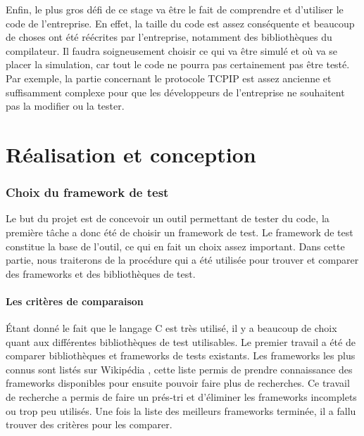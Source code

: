\documentclass[a4paper]{article}
\begin{document}
Enfin, le plus gros défi de ce stage va être le fait de comprendre et d'utiliser
le code de l'entreprise. En effet, la taille du code est assez conséquente et
beaucoup de choses ont été réécrites par l'entreprise, notamment des
bibliothèques du compilateur. Il faudra soigneusement choisir ce qui va être
simulé et où va se placer la simulation, car tout le code ne pourra pas
certainement pas être testé. Par exemple, la partie concernant le protocole
TCPIP est assez ancienne et suffisamment complexe pour que les développeurs de
l'entreprise ne souhaitent pas la modifier ou la tester.
\clearpage
\part{Réalisation et conception}

\section{Choix du framework de test}%

Le but du projet est de concevoir un outil permettant de tester du code, la
première tâche a donc été de choisir un framework de test. Le framework de test
constitue la base de l'outil, ce qui en fait un choix assez important. Dans
cette partie, nous traiterons de la procédure qui a été utilisée pour trouver et
comparer des frameworks et des bibliothèques de test.

\subsection{Les critères de comparaison}%

Étant donné le fait que le langage C est très utilisé, il y a beaucoup de choix
quant aux différentes bibliothèques de test utilisables. Le premier travail a
été de comparer bibliothèques et frameworks de tests existants. Les frameworks
les plus connus sont listés sur Wikipédia \cite{enwikiframeworks}, cette liste
permis de prendre connaissance des frameworks disponibles pour ensuite pouvoir
faire plus de recherches. Ce travail de recherche a permis de faire un prés-tri
et d'éliminer les frameworks incomplets ou trop peu utilisés. Une fois la liste
des meilleurs frameworks terminée, il a fallu trouver des critères pour les
comparer.\\
\end{document}
